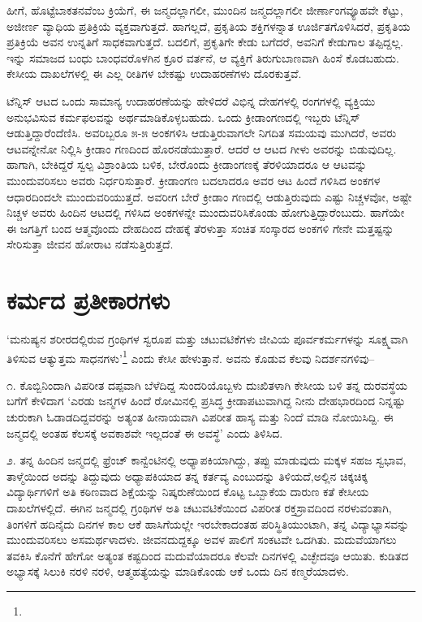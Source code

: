 ಹೀಗೆ, ಹೊಟ್ಟೆಬಾಕತನವೆಂಬ ಕ್ರಿಯೆಗೆ, ಈ ಜನ್ಮದಲ್ಲಾಗಲೀ, ಮುಂದಿನ ಜನ್ಮದಲ್ಲಾಗಲೀ ಜೀರ್ಣಾಂಗವ್ಯೂಹವೇ ಕೆಟ್ಟು, ಅಜೀರ್ಣ ವ್ಯಾಧಿಯ ಪ್ರತಿಕ್ರಿಯೆ ವ್ಯಕ್ತವಾಗುತ್ತದೆ. ಹಾಗಲ್ಲದೆ, ಪ್ರಕೃತಿಯ ಶಕ್ತಿಗಳನ್ನಾತ ಊರ್ಜಿತಗೊಳಿಸಿದರೆ, ಪ್ರಕೃತಿಯ ಪ್ರತಿಕ್ರಿಯೆ ಅವನ ಉನ್ನತಿಗೆ ಸಾಧಕವಾಗುತ್ತದೆ. ಬದಲಿಗೆ, ಪ್ರಕೃತಿಗೇ ಕೇಡು ಬಗೆದರೆ, ಅವನಿಗೆ ಕೇಡುಗಾಲ ತಪ್ಪಿದ್ದಲ್ಲ. ಇನ್ನು ಸಮಾಜದ ಬಂಧು ಬಾಂಧವರೊಳಗಿನ ಕ್ರೂರ ವರ್ತನೆ, ಆ ವ್ಯಕ್ತಿಗೆ ತಿರುಗುಬಾಣವಾಗಿ ಹಿಂಸೆ ಕೊಡಬಹುದು. ಕೇಸೀಯ ದಾಖಲೆಗಳಲ್ಲಿ ಈ ಎಲ್ಲ ರೀತಿಗಳ ಬೇಕಷ್ಟು ಉದಾಹರಣೆಗಳು ದೊರಕುತ್ತವೆ.

ಟೆನ್ನಿಸ್ ಆಟದ ಒಂದು ಸಾಮಾನ್ಯ ಉದಾಹರಣೆಯನ್ನು ಹೇಳಿದರೆ ವಿಭಿನ್ನ ದೇಹಗಳಲ್ಲಿ ರಂಗಗಳಲ್ಲಿ ವ್ಯಕ್ತಿಯು ಅನುಭವಿಸುವ ಕರ್ಮಫಲವನ್ನು ಅರ್ಥಮಾಡಿಕೊಳ್ಳಬಹುದು. ಒಂದು ಕ್ರೀಡಾಂಗಣದಲ್ಲಿ ಇಬ್ಬರು ಟೆನ್ನಿಸ್ ಆಡುತ್ತಿದ್ದಾರೆಂದೆಣಿಸಿ. ಅವರಿಬ್ಬರೂ ೫-೫ ಅಂಕಗಳಿಸಿ ಆಡುತ್ತಿರುವಾಗಲೇ ನಿಗದಿತ ಸಮಯವು ಮುಗಿದರೆ, ಅವರು ಆಟವನ್ನೇನೋ ನಿಲ್ಲಿಸಿ ಕ್ರೀಡಾಂ ಗಣದಿಂದ ಹೊರನಡೆಯುತ್ತಾರೆ. ಆದರೆ ಆ ಆಟದ ಗೀಳು ಅವರನ್ನು ಬಿಡುವುದಿಲ್ಲ. ಹಾಗಾಗಿ, ಬೇಕಿದ್ದರೆ ಸ್ವಲ್ಪ ವಿಶ್ರಾಂತಿಯ ಬಳಿಕ, ಬೇರೊಂದು ಕ್ರೀಡಾಂಗಣಕ್ಕೆ ತೆರಳಿಯಾದರೂ ಆ ಆಟವನ್ನು ಮುಂದುವರಿಸಲು ಅವರು ನಿರ್ಧರಿಸುತ್ತಾರೆ. ಕ್ರೀಡಾಂಗಣ ಬದಲಾದರೂ ಅವರ ಆಟ ಹಿಂದೆ ಗಳಿಸಿದ ಅಂಕಗಳ ಆಧಾರದಿಂದಲೇ ಮುಂದುವರಿಯುತ್ತದೆ. ಅವರೀಗ ಬೇರೆ ಕ್ರೀಡಾಂ ಗಣದಲ್ಲಿ ಆಡುತ್ತಿರುವುದು ಎಷ್ಟು ನಿಚ್ಚಳವೋ, ಅಷ್ಟೇ ನಿಚ್ಚಳ ಅವರು ಹಿಂದಿನ ಆಟದಲ್ಲಿ ಗಳಿಸಿದ ಅಂಕಗಳನ್ನೇ ಮುಂದುವರಿಸಿಕೊಂಡು ಹೋಗುತ್ತಿದ್ದಾರೆಂಬುದು. ಹಾಗೆಯೇ ಈ ಜಗತ್ತಿಗೆ ಬಂದ ಆತ್ಮವೊಂದು ದೇಹದಿಂದ ದೇಹಕ್ಕೆ ತೆರಳುತ್ತಾ ಸಂಚಿತ ಸಂಸ್ಕಾರದ ಅಂಕಗಳಿ ಗೇನೇ ಮತ್ತಷ್ಟನ್ನು ಸೇರಿಸುತ್ತಾ ಜೀವನ ಹೋರಾಟ ನಡೆಸುತ್ತಿರುತ್ತದೆ.


\section{ಕರ್ಮದ ಪ್ರತೀಕಾರಗಳು}

‘ಮನುಷ್ಯನ ಶರೀರದಲ್ಲಿರುವ ಗ್ರಂಥಿಗಳ ಸ್ವರೂಪ ಮತ್ತು ಚಟುವಟಿಕೆಗಳು ಜೀವಿಯ ಪೂರ್ವಕರ್ಮಗಳನ್ನು ಸೂಕ್ಷ್ಮವಾಗಿ ತಿಳಿಸುವ ಆತ್ಯುತ್ತಮ ಸಾಧನಗಳು’\footnote{} ಎಂದು ಕೇಸೀ ಹೇಳುತ್ತಾನೆ. ಅವನು ಕೊಡುವ ಕೆಲವು ನಿದರ್ಶನಗಳಿವು–

೧. ಕೊಬ್ಬಿನಿಂದಾಗಿ ವಿಪರೀತ ದಪ್ಪವಾಗಿ ಬೆಳೆದಿದ್ದ ಸುಂದರಿಯೊಬ್ಬಳು ದುಃಖಿತಳಾಗಿ ಕೇಸೀಯ ಬಳಿ ತನ್ನ ದುರವಸ್ಥೆಯ ಬಗೆಗೆ ಕೇಳಿದಾಗ ‘ಎರಡು ಜನ್ಮಗಳ ಹಿಂದೆ ರೋಮಿನಲ್ಲಿ ಪ್ರಸಿದ್ಧ ಕ್ರೀಡಾಪಟುವಾಗಿದ್ದ ನೀನು ದೇಹಭಾರದಿಂದ ನಿನ್ನಷ್ಟು ಚುರುಕಾಗಿ ಓಡಾಡದಿದ್ದವರನ್ನು ಅತ್ಯಂತ ಹೀನಾಯವಾಗಿ ವಿಪರೀತ ಹಾಸ್ಯ ಮತ್ತು ನಿಂದೆ ಮಾಡಿ ನೋಯಿಸಿದ್ದಿ. ಈ ಜನ್ಮದಲ್ಲಿ ಅಂತಹ ಕೆಲಸಕ್ಕೆ ಅವಕಾಶವೇ ಇಲ್ಲದಂತೆ ಈ ಅವಸ್ಥೆ’ ಎಂದು ತಿಳಿಸಿದ.

೨. ತನ್ನ ಹಿಂದಿನ ಜನ್ಮದಲ್ಲಿ ಫ್ರೆಂಚ್ ಕಾನ್ವೆಂಟಿನಲ್ಲಿ ಅಧ್ಯಾಪಕಿಯಾಗಿದ್ದು, ತಪ್ಪು ಮಾಡುವುದು ಮಕ್ಕಳ ಸಹಜ ಸ್ವಭಾವ, ತಾಳ್ಮೆಯಿಂದ ಅದನ್ನು ತಿದ್ದುವುದು ಅಧ್ಯಾಪಕಿಯಾದ ತನ್ನ ಕರ್ತವ್ಯ ಎಂಬುದನ್ನು ತಿಳಿಯದೆ,ಅಲ್ಲಿನ ಚಿಕ್ಕಚಿಕ್ಕ ವಿದ್ಯಾರ್ಥಿಗಳಿಗೆ ಅತಿ ಕಠಿಣವಾದ ಶಿಕ್ಷೆಯನ್ನು ನಿಷ್ಕರುಣೆಯಿಂದ ಕೊಟ್ಟ ಒಬ್ಬಾಕೆಯ ದಾರುಣ ಕತೆ ಕೇಸೀಯ ದಾಖಲೆಗಳಲ್ಲಿದೆ. ಈಗಿನ ಜನ್ಮದಲ್ಲಿ ಗ್ರಂಥಿಗಳ ಅತಿ ಚಟುವಟಿಕೆಯಿಂದ ವಿಪರೀತ ರಕ್ತಸ್ರಾವದಿಂದ ನರಳುವಂತಾಗಿ, ತಿಂಗಳಿಗೆ ಹದಿನೈದು ದಿನಗಳ ಕಾಲ ಆಕೆ ಹಾಸಿಗೆಯಲ್ಲೇ ಇರಬೇಕಾದಂತಹ ಪರಿಸ್ಥಿತಿಯುಂಟಾಗಿ, ತನ್ನ ವಿದ್ಯಾಭ್ಯಾಸವನ್ನು ಮುಂದುವರಿಸಲು ಅಸಮರ್ಥಳಾದಳು. ಜೀವನದುದ್ದಕ್ಕೂ ಅವಳ ಪಾಲಿಗೆ ಸಂಕಟವೇ ಒದಗಿತು. ಮದುವೆಯಾಗಲು ತವಕಿಸಿ ಕೊನೆಗೆ ಹೇಗೋ ಅತ್ಯಂತ ಕಷ್ಟದಿಂದ ಮದುವೆಯಾದರೂ ಕೆಲವೇ ದಿನಗಳಲ್ಲಿ ವಿಚ್ಛೇದವೂ ಆಯಿತು. ಕುಡಿತದ ಅಭ್ಯಾಸಕ್ಕೆ ಸಿಲುಕಿ ನರಳಿ ನರಳಿ, ಆತ್ಮಹತ್ಯೆಯನ್ನು ಮಾಡಿಕೊಂಡು ಆಕೆ ಒಂದು ದಿನ ಕಣ್ಮರೆಯಾದಳು.


